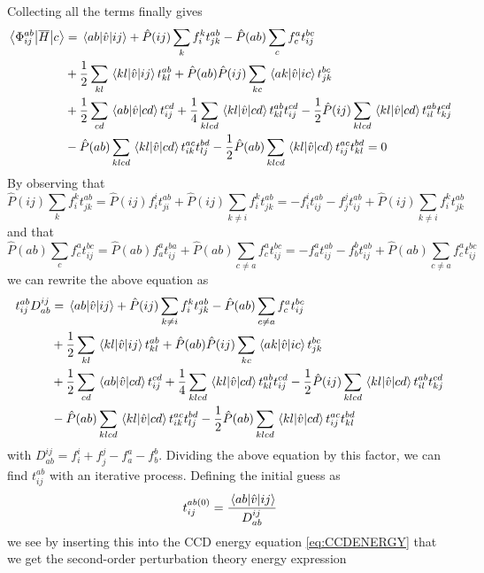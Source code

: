 \documentclass[a4paper,12pt]{article}
\newcommand{\brak}[2]{\mel{#1}{\hat{v}}{#2}}
\begin{document}
Collecting all the terms finally gives
\begin{align*}
    \mel{\Phi_{ij}^{ab}}{\overline{H}}{c} &= \brak{ab}{ij} + \hat{P}(ij)\sum_k f_i^k t_{jk}^{ab} - \hat{P}(ab)\sum_c f_c^a t_{ij}^{bc} \\
    &+ \frac{1}{2}\sum_{kl} \brak{kl}{ij}t^{ab}_{kl} + \hat{P}(ab)\hat{P}(ij) \sum_{kc} \brak{ak}{ic}t_{jk}^{bc} \\
    &+ \frac{1}{2}\sum_{cd} \brak{ab}{cd}t^{cd}_{ij} + \frac{1}{4} \sum_{klcd}\brak{kl}{cd}t_{kl}^{ab}t_{ij}^{cd} - \frac{1}{2}\hat{P}(ij) \sum_{klcd} \brak{kl}{cd}t^{ab}_{il}t^{cd}_{kj} \\
    &- \hat{P}(ab)\sum_{klcd}\brak{kl}{cd}t_{ik}^{ac}t_{lj}^{bd} - \frac{1}{2}\hat{P}(ab)\sum_{klcd}\brak{kl}{cd}t_{ij}^{ac}t_{kl}^{bd} = 0
\end{align*}
By observing that 
$$\hat{P}(ij)\sum_k f_i^k t_{jk}^{ab} = \hat{P}(ij)f_i^i t_{ji}^{ab} + \hat{P}(ij)\sum_{k\neq i} f_i^k t_{jk}^{ab} =  -f_i^i t_{ij}^{ab} - f_j^j t_{ij}^{ab} + \hat{P}(ij)\sum_{k\neq i} f_i^k t_{jk}^{ab} $$
and that
$$\hat{P}(ab)\sum_c f_c^at_{ij}^{bc} = \hat{P}(ab)f_a^at_{ij}^{ba} + \hat{P}(ab)\sum_{c \neq a} f_c^a t_{ij}^{bc} = -f_a^at_{ij}^{ab} - f_b^bt_{ij}^{ab} + \hat{P}(ab)\sum_{c \neq a} f_c^a t_{ij}^{bc}$$
we can rewrite the above equation as
\begin{align}
    \label{eq:AmplitudeIterative}
    t_{ij}^{ab}D_{ab}^{ij} &= \brak{ab}{ij} + \hat{P}(ij)\sum_{k \neq i} f_i^k t_{jk}^{ab} - \hat{P}(ab)\sum_{c \neq a} f_c^a t_{ij}^{bc} \notag \\
    &+ \frac{1}{2}\sum_{kl} \brak{kl}{ij}t^{ab}_{kl} + \hat{P}(ab)\hat{P}(ij) \sum_{kc} \brak{ak}{ic}t_{jk}^{bc} \notag \\
    &+ \frac{1}{2}\sum_{cd} \brak{ab}{cd}t^{cd}_{ij} + \frac{1}{4} \sum_{klcd}\brak{kl}{cd}t_{kl}^{ab}t_{ij}^{cd} - \frac{1}{2}\hat{P}(ij) \sum_{klcd} \brak{kl}{cd}t^{ab}_{il}t^{cd}_{kj} \\
    &- \hat{P}(ab)\sum_{klcd}\brak{kl}{cd}t_{ik}^{ac}t_{lj}^{bd} - \frac{1}{2}\hat{P}(ab)\sum_{klcd}\brak{kl}{cd}t_{ij}^{ac}t_{kl}^{bd} \notag
\end{align}
with $D_{ab}^{ij} = f_i^i + f_j^j - f_a^a - f_b^b$. Dividing the above equation by this factor, we can find $t_{ij}^{ab}$ with an iterative process. Defining the initial guess as
\begin{equation}
    \label{eq:initamplitude}
    t_{ij}^{ab(0)} = \frac{\brak{ab}{ij}}{D_{ab}^{ij}}
\end{equation}
we see by inserting this into the CCD energy equation \ref{eq:CCDENERGY} that we get the second-order perturbation theory energy expression
\end{document}
